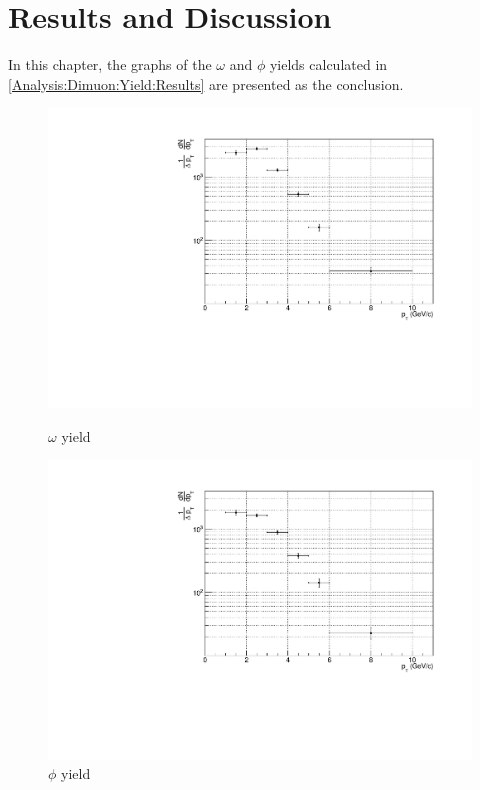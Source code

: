 \newpage
\clearpage
\section{Results and Discussion}
In this chapter, the graphs of the $\omega$ and $\phi$ yields calculated in \ref{Analysis:Dimuon:Yield:Results} are presented as the conclusion.
    \begin{figure}[htbp]
        \centering
        \begin{minipage}{0.45\textwidth} %
            \centering
            \includegraphics[width=\textwidth]{fig/4_omega_yield.pdf} %
            \caption{$\omega$ yield}
            \label{fig:omega_yield}
        \end{minipage}
        \hfill
        \begin{minipage}{0.45\textwidth}
            \centering
            \includegraphics[width=\textwidth]{fig/4_phi_yield.pdf} %
            \caption{$\phi$ yield}
            \label{fig:phi_yield}
        \end{minipage}
    \end{figure}
